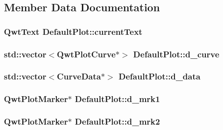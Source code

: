 \subsection{Member Data Documentation}
\hypertarget{class_default_plot_aecabd8aa4a721d21e1e01dcc41c621ea}{
\subsubsection[{current\+Text}]{\setlength{\rightskip}{0pt plus 5cm}Qwt\+Text Default\+Plot\+::current\+Text\hspace{0.3cm}{\ttfamily [protected]}}}\label{class_default_plot_aecabd8aa4a721d21e1e01dcc41c621ea}
\hypertarget{class_default_plot_a154b2bb7e4528185f88ff204da70e4de}{
\subsubsection[{d\+\_\+curve}]{\setlength{\rightskip}{0pt plus 5cm}std\+::vector$<$Qwt\+Plot\+Curve$\ast$$>$ Default\+Plot\+::d\+\_\+curve}}\label{class_default_plot_a154b2bb7e4528185f88ff204da70e4de}
\hypertarget{class_default_plot_aa78c1b3ad9d6328731ecae5a27b9d0b1}{
\subsubsection[{d\+\_\+data}]{\setlength{\rightskip}{0pt plus 5cm}std\+::vector$<${\bf Curve\+Data}$\ast$$>$ Default\+Plot\+::d\+\_\+data}}\label{class_default_plot_aa78c1b3ad9d6328731ecae5a27b9d0b1}
\hypertarget{class_default_plot_ada5a5d4e6f0996d79b0a4ba353f12726}{
\subsubsection[{d\+\_\+mrk1}]{\setlength{\rightskip}{0pt plus 5cm}Qwt\+Plot\+Marker$\ast$ Default\+Plot\+::d\+\_\+mrk1\hspace{0.3cm}{\ttfamily [protected]}}}\label{class_default_plot_ada5a5d4e6f0996d79b0a4ba353f12726}
\hypertarget{class_default_plot_a8021357960017f7338d48981e32b8ae4}{
\subsubsection[{d\+\_\+mrk2}]{\setlength{\rightskip}{0pt plus 5cm}Qwt\+Plot\+Marker$\ast$ Default\+Plot\+::d\+\_\+mrk2\hspace{0.3cm}{\ttfamily [protected]}}}\label{class_default_plot_a8021357960017f7338d48981e32b8ae4}
